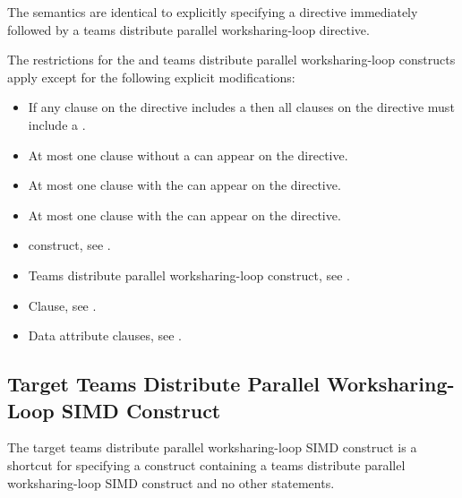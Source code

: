 \descr
The semantics are identical to explicitly specifying a 
directive immediately followed by a teams distribute parallel worksharing-loop 
directive.

\restrictions
The restrictions for the  and teams distribute parallel
worksharing-loop constructs apply except for the following explicit modifications:

\begin{itemize}
\item If any  clause on the directive includes a
       then all  clauses
      on the directive must include a .
\item At most one  clause without a
       can appear on the directive.
\item At most one  clause with the 
       can appear on the directive.
\item At most one  clause with the 
       can appear on the directive.
\end{itemize}

\crossreferences
\begin{itemize}
\item {} construct, see .

\item Teams distribute parallel worksharing-loop construct, see
.

\item {} Clause, see .

\item Data attribute clauses, see
.
\end{itemize}



\subsection{Target Teams Distribute Parallel Worksharing-Loop SIMD Construct}
\label{subsec:Target Teams Distribute Parallel Loop SIMD Construct}
\summary
The target teams distribute parallel worksharing-loop SIMD construct is a shortcut 
for specifying a  construct containing a teams distribute parallel 
worksharing-loop SIMD construct and no other statements.

